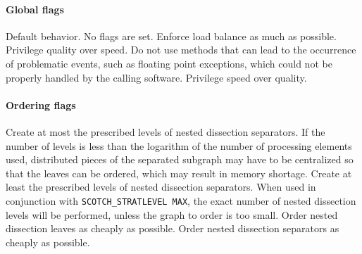 \paragraph{Global flags}

\begin{itemize}
Default behavior. No flags are set.
Enforce load balance as much as possible.
Privilege quality over speed.
Do not use methods that can lead to the occurrence of problematic
events, such as floating point exceptions, which could not be properly
handled by the calling software.
Privilege speed over quality.
\end{itemize}



\paragraph{Ordering flags}

\begin{itemize}
Create at most the prescribed levels of nested dissection
separators. If the number of levels is less than the logarithm of the
number of processing elements used, distributed pieces of the
separated subgraph may have to be centralized so that the leaves can
be ordered, which may result in memory shortage.
Create at least the prescribed levels of nested dissection separators.
When used in conjunction with {\tt SCOTCH\_\lbt STRAT\lbt LEVEL\lbt
MAX}, the exact number of nested dissection levels will be performed,
unless the graph to order is too small.
Order nested dissection leaves as cheaply as possible.
Order nested dissection separators as cheaply as possible.
\end{itemize}

